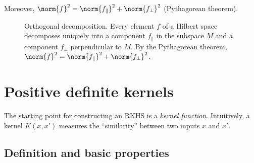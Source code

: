 \begin{notechapter}
\begin{theorem}
Moreover, $\norm{f}^2 = \norm{f_\parallel}^2 + \norm{f_\perp}^2$
(Pythagorean theorem).
\end{theorem}

\begin{figure}[ht]
\centering
{}
\caption{Orthogonal decomposition. Every element $f$ of a Hilbert space
decomposes uniquely into a component $f_\parallel$ in the subspace $M$
and a component $f_\perp$ perpendicular to $M$. By the Pythagorean
theorem, $\norm{f}^2 = \norm{f_\parallel}^2 + \norm{f_\perp}^2$.}
\label{rkhs:fig:ortho_decomp}
\end{figure}


\section{Positive definite kernels}
\label{rkhs:sec:kernels}

The starting point for constructing an RKHS is a \emph{kernel function}.
Intuitively, a kernel $K(x,x')$ measures the ``similarity'' between two
inputs $x$ and $x'$.

\subsection{Definition and basic properties}
\label{rkhs:subsec:kernel_def}


\end{notechapter}
